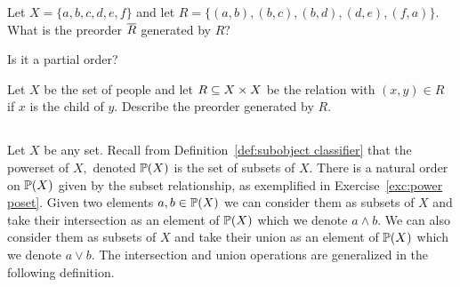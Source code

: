 \documentclass[../main/CT4S-EN-RU]{subfiles}
\begin{document}
\begin{exampleRUS}\label{ex:preorder generated}
\end{exampleRUS}

\begin{exerciseENG}
Let $X=\{a,b,c,d,e,f\}$ and let $R=\{(a,b),(b,c),(b,d),(d,e),(f,a)\}.$ 
\sexc What is the preorder $\ol{R}$ generated by $R?$
\item Is it a partial order?
\endsexc
\end{exerciseENG}

\begin{exerciseRUS}
\end{exerciseRUS}

\begin{exerciseENG}
Let $X$ be the set of people and let $R\ss X\times X$ be the relation with $(x,y)\in R$ if $x$ is the child of $y.$ Describe the preorder generated by $R.$
\end{exerciseENG}

\begin{exerciseRUS}
\end{exerciseRUS}


\subsection{}\label{sec:meets and joins}

\begin{blockENG}
Let $X$ be any set. Recall from Definition~\ref{def:subobject classifier} that the powerset of $X,$ denoted $\PP(X)$ is the set of subsets of $X.$ There is a natural order on $\PP(X)$ given by the subset relationship, as exemplified in Exercise~\ref{exc:power poset}. Given two elements $a,b\in\PP(X)$ we can consider them as subsets of $X$ and take their intersection as an element of $\PP(X)$ which we denote $a\wedge b.$ We can also consider them as subsets of $X$ and take their union as an element of $\PP(X)$ which we denote $a\vee b.$ The intersection and union operations are generalized in the following definition.
\end{blockENG}

\begin{blockRUS}
\end{blockRUS}
\end{document}
